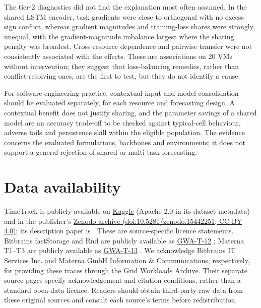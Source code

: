 \documentclass[a4paper,fleqn]{cas-dc}
\begin{document}
The tier-2 diagnostics did not find the explanation most often assumed. In
the shared LSTM encoder, task gradients were close to orthogonal with no
excess sign conflict, whereas gradient magnitudes and training-loss shares
were strongly unequal, with the gradient-magnitude imbalance largest where
the sharing penalty was broadest. Cross-resource dependence and pairwise
transfer were not consistently associated with the effects. These are
associations on 20 VMs without intervention; they suggest that
loss-balancing remedies, rather than conflict-resolving ones, are the
first to test, but they do not identify a cause.

For software-engineering practice, contextual input and model consolidation
should be evaluated separately, for each resource and forecasting design. A
contextual benefit does not justify sharing, and the parameter savings of a
shared model are an accuracy trade-off to be checked against typical-cell
behaviour, adverse tails and persistence skill within the eligible
population. The evidence concerns the evaluated formulations, backbones and
environments; it does not support a general rejection of shared or
multi-task forecasting.

\section*{Data availability}

TimeTrack is publicly available on
\href{https://www.kaggle.com/datasets/abdelghanimeliani/open-air-interface-cicd-timeseries-dataset}{Kaggle}
(Apache 2.0 in its dataset metadata) and in the publisher's
\href{https://doi.org/10.5281/zenodo.15442251}{Zenodo archive
(doi:10.5281/zenodo.15442251; CC BY 4.0)}; its description paper is
\citet{Meliani2025TimeTrack}. These are source-specific licence statements.
Bitbrains fastStorage and Rnd are publicly available as
\href{https://atlarge-research.com/gwa-t-12/}{GWA-T-12}
\citep{Shen2015Bitbrains}; Materna T1--T3 are publicly available as
\href{https://atlarge-research.com/gwa-t-13/}{GWA-T-13}
\citep{Kohne2014FederatedCloudSim,Kohne2016SLAScheduling}.
We acknowledge Bitbrains IT Services Inc. and Materna GmbH Information
\& Communications, respectively, for providing these traces through the
Grid Workloads Archive. Their separate source pages specify acknowledgement
and citation conditions, rather than a standard open-data licence. Readers
should obtain third-party raw data from these original sources and consult
each source's terms before redistribution.
\end{document}
